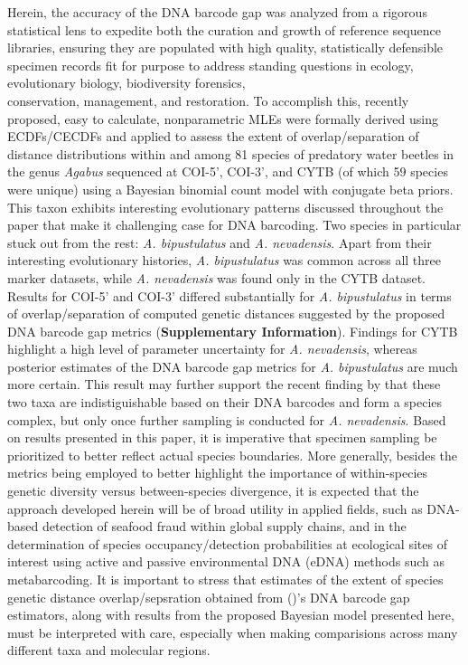 \documentclass[12pt]{article}
\begin{document}
Herein, the accuracy of the DNA barcode gap was analyzed from a rigorous statistical lens to expedite both the curation and growth of reference sequence libraries, ensuring they are populated with high quality, statistically defensible specimen records fit for purpose to address standing questions in ecology, evolutionary biology, biodiversity forensics, \\ conservation, management, and restoration. To accomplish this, recently proposed, easy to calculate, nonparametric MLEs were formally derived using ECDFs/CECDFs and applied to assess the extent of overlap/separation of distance distributions within and among 81 species of predatory water beetles in the genus \textit{Agabus} sequenced at COI-5', COI-3', and CYTB (of which 59 species were unique) using a Bayesian binomial count model with conjugate beta priors. This taxon exhibits interesting evolutionary patterns discussed throughout the paper that make it challenging case for DNA barcoding. Two species in particular stuck out from the rest: \textit{A. bipustulatus} and \textit{A. nevadensis}. Apart from their interesting evolutionary histories, \textit{A. bipustulatus} was common across all three marker datasets, while \textit{A. nevadensis} was found only in the CYTB dataset. Results for COI-5' and COI-3' differed substantially for \textit{A. bipustulatus} in terms of overlap/separation of computed genetic distances suggested by the proposed DNA barcode gap metrics (\textbf{Supplementary Information}). Findings for CYTB highlight a high level of parameter uncertainty for \textit{A. nevadensis}, whereas posterior estimates of the DNA barcode gap metrics for \textit{A. bipustulatus} are much more certain. This result may further support the recent finding by \citet{pallares2024genomic} that these two taxa are indistiguishable based on their DNA barcodes and form a species complex, but only once further sampling is conducted for \textit{A. nevadensis}. Based on results presented in this paper, it is imperative that specimen sampling be prioritized to better reflect actual species boundaries. More generally, besides the metrics being employed to better highlight the importance of within-species genetic diversity versus between-species divergence, it is expected that the approach developed herein will be of broad utility in applied fields, such as DNA-based detection of seafood fraud within global supply chains, and in the determination of species occupancy/detection probabilities at ecological sites of interest using active and passive environmental DNA (eDNA) methods such as metabarcoding. It is important to stress that estimates of the extent of species genetic distance overlap/sepsration obtained from \citeauthor{phillips2024measure} (\citeyear{phillips2024measure})'s DNA barcode gap estimators, along with results from the proposed Bayesian model presented here, must be interpreted with care, especially when making comparisions across many different taxa and molecular regions.
\end{document}
